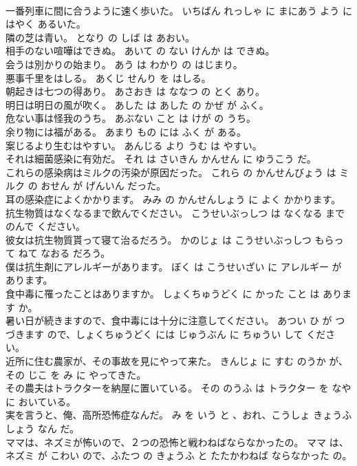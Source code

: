 \documentclass[8pt]{extreport}
\begin{document}
\begin{CJK}{UTF8}{min}
\\	一番列車に間に合うように速く歩いた。	いちばん れっしゃ に まにあう よう に はやく あるいた。	
\\	隣の芝は青い。	となり の しば は あおい。	
\\	相手のない喧嘩はできぬ。	あいて の ない けんか は できぬ。	
\\	会うは別かりの始まり。	あう は わかり の はじまり。	
\\	悪事千里をはしる。	あくじ せんり を はしる。	
\\	朝起きは七つの得あり。	あさおき は ななつ の とく あり。	
\\	明日は明日の風が吹く。	あした は あした の かぜ が ふく。	
\\	危ない事は怪我のうち。	あぶない こと は けが の うち。	
\\	余り物には福がある。	あまり もの には ふく が ある。	
\\	案じるより生むはやすい。	あんじる より うむ は やすい。	
\\	それは細菌感染に有効だ。	それ は さいきん かんせん に ゆうこう だ。	
\\	これらの感染病はミルクの汚染が原因だった。	これら の かんせんびょう は ミルク の おせん が げんいん だった。	
\\	耳の感染症によくかかります。	みみ の かんせんしょう に よく かかります。	
\\	抗生物質はなくなるまで飲んでください。	こうせいぶっしつ は なくなる まで のんで ください。	
\\	彼女は抗生物質貰って寝て治るだろう。	かのじょ は こうせいぶっしつ もらって ねて なおる だろう。	
\\	僕は抗生剤にアレルギーがあります。	ぼく は こうせいざい に アレルギー が あります。	
\\	食中毒に罹ったことはありますか。	しょくちゅうどく に かった こと は あります か。	
\\	暑い日が続きますので、食中毒には十分に注意してください。	あつい ひ が つづきます ので、しょくちゅうどく には じゅうぶん に ちゅうい して ください。	
\\	近所に住む農家が、その事故を見にやって来た。	きんじょ に すむ のうか が、その じこ を み に やってきた。	
\\	その農夫はトラクターを納屋に置いている。	その のうふ は トラクター を なや に おいている。	
\\	実を言うと、俺、高所恐怖症なんだ。	み を いう と 、おれ、こうしょ きょうふしょう なん だ。	
\\	ママは、ネズミが怖いので、２つの恐怖と戦わねばならなかったの。	ママ は、ネズミ が こわい ので、ふたつ の きょうふ と たたかわねば ならなかった の。	

\end{CJK}
\end{document}

